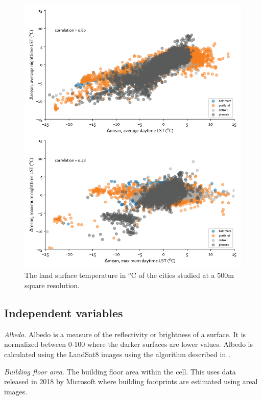 \documentclass[final,3p,times,twocolumn,sort&compress]{elsarticle}
\begin{document}
\begin{figure}
    \begin{center}
    \includegraphics[width=\linewidth]{fig/report/scatter_500.png}
    \caption{The land surface temperature in $^o$C of the cities studied at a 500m square resolution.}
    \label{fig:scatter_lst}
    \end{center}
\end{figure}

\subsection{Independent variables}

\textit{Albedo}. Albedo is a measure of the reflectivity or brightness of a surface. It is normalized between 0-100 where the darker surfaces are lower values. Albedo is calculated using the LandSat8 images using the algorithm described in \cite{Smith2010-nw, Liang2001-jd}. 

\textit{Building floor area}. The building floor area within the cell. This uses data released in 2018 by Microsoft where building footprints are estimated using areal images. 
\end{document}
